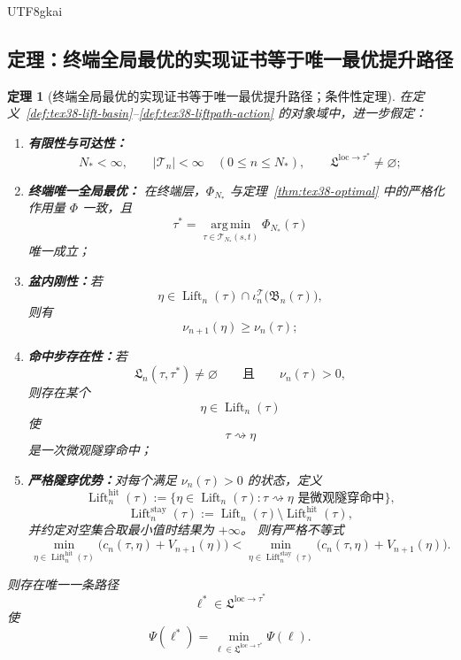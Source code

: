 \documentclass[12pt]{article}
\newtheorem{theorem}{定理}[section]
\newcommand{\Lift}{\operatorname{Lift}}
\begin{document}
\begin{CJK*}{UTF8}{gkai}
\subsection{定理：终端全局最优的实现证书等于唯一最优提升路径}
\label{subsec:tex38-liftpath-optimal}

\begin{theorem}[终端全局最优的实现证书等于唯一最优提升路径；条件性定理]
\label{thm:tex38-liftpath-optimal}
在定义~\ref{def:tex38-lift-basin}--\ref{def:tex38-liftpath-action} 的对象域中，进一步假定：
\begin{enumerate}
  \item[\textbf{A.}] \textbf{有限性与可达性：}
  \[
    N_\ast<\infty,
    \qquad
    |\mathcal T_n|<\infty
    \quad
    (0\le n\le N_\ast),
    \qquad
    \mathfrak L^{\mathrm{loc}\to\tau^\ast}\neq\varnothing;
  \]
  \item[\textbf{B.}] \textbf{终端唯一全局最优：}
  在终端层，$\Phi_{N_\ast}$ 与定理~\ref{thm:tex38-optimal} 中的严格化作用量 $\Phi$ 一致，且
  \[
    \tau^\ast
    =
    \operatorname*{arg\,min}_{\tau\in\mathcal T_{N_\ast}(s,t)}
    \Phi_{N_\ast}(\tau)
  \]
  唯一成立；
  \item[\textbf{C.}] \textbf{盆内刚性：}若
  \[
    \eta\in\Lift_n(\tau)\cap \iota_n^{\mathcal T}\bigl(\mathfrak B_n(\tau)\bigr),
  \]
  则有
  \[
    \nu_{n+1}(\eta)\ge \nu_n(\tau);
  \]
  \item[\textbf{D.}] \textbf{命中步存在性：}若
  \[
    \mathfrak L_n(\tau,\tau^\ast)\neq\varnothing
    \qquad\text{且}\qquad
    \nu_n(\tau)>0,
  \]
  则存在某个
  \[
    \eta\in\Lift_n(\tau)
  \]
  使
  \[
    \tau\rightsquigarrow\eta
  \]
  是一次微观隧穿命中；
  \item[\textbf{E.}] \textbf{严格隧穿优势：}对每个满足 $\nu_n(\tau)>0$ 的状态，定义
  \[
    \Lift_n^{\mathrm{hit}}(\tau)
    :=
    \bigl\{
      \eta\in\Lift_n(\tau):
      \tau\rightsquigarrow\eta\text{ 是微观隧穿命中}
    \bigr\},
  \]
  \[
    \Lift_n^{\mathrm{stay}}(\tau)
    :=
    \Lift_n(\tau)\setminus\Lift_n^{\mathrm{hit}}(\tau),
  \]
  并约定对空集合取最小值时结果为 $+\infty$。
  则有严格不等式
  \[
    \min_{\eta\in\Lift_n^{\mathrm{hit}}(\tau)}
    \bigl(
      c_n(\tau,\eta)+V_{n+1}(\eta)
    \bigr)
    <
    \min_{\eta\in\Lift_n^{\mathrm{stay}}(\tau)}
    \bigl(
      c_n(\tau,\eta)+V_{n+1}(\eta)
    \bigr).
  \]
\end{enumerate}
则存在唯一一条路径
\[
  \ell^\ast\in\mathfrak L^{\mathrm{loc}\to\tau^\ast}
\]
使
\[
  \Psi(\ell^\ast)
  =
  \min_{\ell\in\mathfrak L^{\mathrm{loc}\to\tau^\ast}}
  \Psi(\ell).
\]
\end{theorem}
\end{CJK*}
\end{document}
